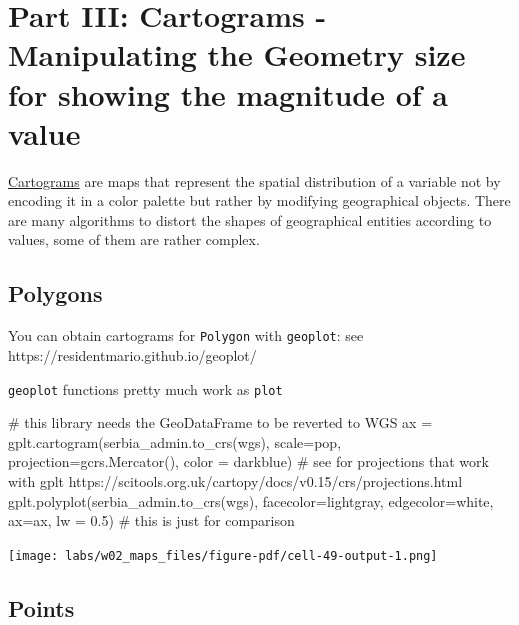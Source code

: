 \documentclass[
  letterpaper,
  DIV=11,
  numbers=noendperiod]{scrreprt}
\newenvironment{Shaded}{\begin{snugshade}}{\end{snugshade}}
\newcommand{\CommentTok}[1]{\textcolor[rgb]{0.37,0.37,0.37}{#1}}
\newcommand{\FloatTok}[1]{\textcolor[rgb]{0.68,0.00,0.00}{#1}}
\newcommand{\NormalTok}[1]{\textcolor[rgb]{0.00,0.23,0.31}{#1}}
\newcommand{\OperatorTok}[1]{\textcolor[rgb]{0.37,0.37,0.37}{#1}}
\newcommand{\StringTok}[1]{\textcolor[rgb]{0.13,0.47,0.30}{#1}}
\begin{document}
\section{Part III: Cartograms - Manipulating the Geometry size for
showing the magnitude of a
value}\label{part-iii-cartograms---manipulating-the-geometry-size-for-showing-the-magnitude-of-a-value}

\href{https://www.data-to-viz.com/graph/cartogram.html}{Cartograms} are
maps that represent the spatial distribution of a variable not by
encoding it in a color palette but rather by modifying geographical
objects. There are many algorithms to distort the shapes of geographical
entities according to values, some of them are rather complex.

\subsection{Polygons}\label{polygons}

You can obtain cartograms for \texttt{Polygon} with \texttt{geoplot}:
see https://residentmario.github.io/geoplot/

\texttt{geoplot} functions pretty much work as \texttt{plot}

\begin{Shaded}
\begin{Highlighting}[]
\CommentTok{\# this library needs the GeoDataFrame to be reverted to WGS}
\NormalTok{ax }\OperatorTok{=}\NormalTok{ gplt.cartogram(serbia\_admin.to\_crs(wgs), scale}\OperatorTok{=}\StringTok{\textquotesingle{}pop\textquotesingle{}}\NormalTok{, projection}\OperatorTok{=}\NormalTok{gcrs.Mercator(), color }\OperatorTok{=} \StringTok{\textquotesingle{}darkblue\textquotesingle{}}\NormalTok{)}
\CommentTok{\# see for projections that work with gplt https://scitools.org.uk/cartopy/docs/v0.15/crs/projections.html}
\NormalTok{gplt.polyplot(serbia\_admin.to\_crs(wgs), facecolor}\OperatorTok{=}\StringTok{\textquotesingle{}lightgray\textquotesingle{}}\NormalTok{, edgecolor}\OperatorTok{=}\StringTok{\textquotesingle{}white\textquotesingle{}}\NormalTok{, ax}\OperatorTok{=}\NormalTok{ax, lw }\OperatorTok{=} \FloatTok{0.5}\NormalTok{) }\CommentTok{\# this is just for comparison}
\end{Highlighting}
\end{Shaded}

\texttt{[image: labs/w02\_maps\_files/figure-pdf/cell-49-output-1.png]}

\subsection{Points}\label{points}
\end{document}
